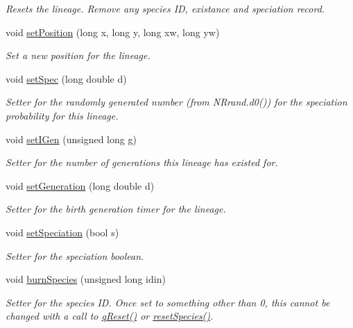 \begin{DoxyCompactItemize}
\begin{DoxyCompactList}\small\item\em Resets the lineage. Remove any species ID, existance and speciation record. \end{DoxyCompactList}\item 
void \hyperlink{class_treenode_a6cdacbd3e26bd70dfb0c974b52456970}{set\+Position} (long x, long y, long xw, long yw)
\begin{DoxyCompactList}\small\item\em Set a new position for the lineage. \end{DoxyCompactList}\item 
void \hyperlink{class_treenode_a4d54472f94fc213570dd50fd32b997f7}{set\+Spec} (long double d)
\begin{DoxyCompactList}\small\item\em Setter for the randomly generated number (from N\+Rrand.\+d0()) for the speciation probability for this lineage. \end{DoxyCompactList}\item 
void \hyperlink{class_treenode_ac926fbbbe37c10eca7930b9d6f07b072}{set\+I\+Gen} (unsigned long g)
\begin{DoxyCompactList}\small\item\em Setter for the number of generations this lineage has existed for. \end{DoxyCompactList}\item 
void \hyperlink{class_treenode_a1f53687ac75f39008ac4a8b6869a5266}{set\+Generation} (long double d)
\begin{DoxyCompactList}\small\item\em Setter for the birth generation timer for the lineage. \end{DoxyCompactList}\item 
void \hyperlink{class_treenode_a116b74093b6ccb16323f958be4820e7e}{set\+Speciation} (bool s)
\begin{DoxyCompactList}\small\item\em Setter for the speciation boolean. \end{DoxyCompactList}\item 
void \hyperlink{class_treenode_ad4373585fe62f316eeabd88b9c2d7b2f}{burn\+Species} (unsigned long idin)
\begin{DoxyCompactList}\small\item\em Setter for the species ID. Once set to something other than 0, this cannot be changed with a call to \hyperlink{class_treenode_a9f67cecf8724424486f08b31080a3f21}{q\+Reset()} or \hyperlink{class_treenode_aeb5aa21b29ab16bd0c50012aa6e052b7}{reset\+Species()}. \end{DoxyCompactList}\item 

\end{DoxyCompactItemize}
